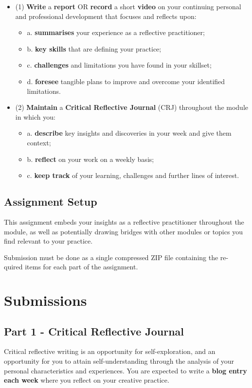 \documentclass{../../fal_assignment}
\begin{document}
\begin{itemize}
		\item (1)  \textbf{Write} a \textbf{report} OR \textbf{record} a short \textbf{video} on your continuing personal and professional development that focuses and reflects upon:
		\begin{itemize}
			\item a.  \textbf{summarises} your experience as a reflective practitioner;
			\item b.  \textbf{key skills} that are defining your practice;
			\item c.  \textbf{challenges} and limitations you have found in your skillset;
			\item d.  \textbf{foresee} tangible plans to improve and overcome your identified limitations.
		\end{itemize}
		\item (2)  \textbf{Maintain} a \textbf{Critical Reflective Journal} (CRJ) throughout the module in which you:
		\begin{itemize}
			\item a.  \textbf{describe} key insights and discoveries in your week and give them context;
			\item b.  \textbf{reflect} on your work on a weekly basis;
			\item c.  \textbf{keep track} of your learning, challenges and further lines of interest.
		\end{itemize}
\end{itemize}
\subsection*{Assignment Setup} 

This assignment embeds your insights as a reflective practitioner throughout the module, as well as potentially drawing bridges with other modules or topics you find relevant to your practice.

Submission must be done as a single compressed ZIP file containing the re- quired items for each part of the assignment.
\pagebreak
\section*{Submissions}
\subsection*{Part 1 - Critical Reflective Journal} 

Critical reflective writing is an opportunity for self-exploration, and an opportunity for you to attain self-understanding through the analysis of your personal characteristics and experiences. You are expected to write a \textbf{blog entry each week} where you reflect on your creative practice.
\end{document}
